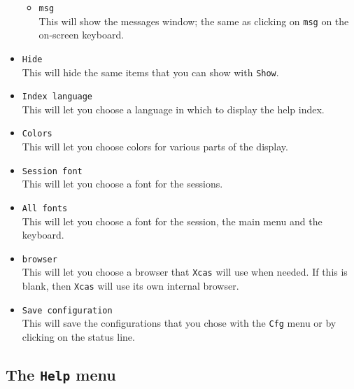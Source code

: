 \documentclass[a4paper,11pt]{book}
\begin{document}
\begin{itemize}
\begin{itemize}
    \item \texttt{msg}\\
    This will show the messages window; the same as clicking on
    \texttt{msg} on the on-screen keyboard.
  \end{itemize}

  \item \texttt{Hide}\\
  This will hide the same items that you can show with \texttt{Show}.
  
  \item \texttt{Index language}\\
  This will let you choose a language in which to display the help index.
  
  \item \texttt{Colors}\\
  This will let you choose colors for various parts of the display.
  
  \item \texttt{Session font}\\
  This will let you choose a font for the sessions.
  
  \item \texttt{All fonts}\\
  This will let you choose a font for the session, the main menu and
  the keyboard.
  
  \item \texttt{browser}\\
  This will let you choose a browser that \texttt{Xcas} will use when
  needed.  If this is blank, then \texttt{Xcas} will use its own
  internal browser.
  
  \item \texttt{Save configuration}\\
  This will save the configurations that you chose with the
  \texttt{Cfg} menu or by clicking on the status line.
\end{itemize}

\subsection{The \texttt{Help} menu}
\end{document}

